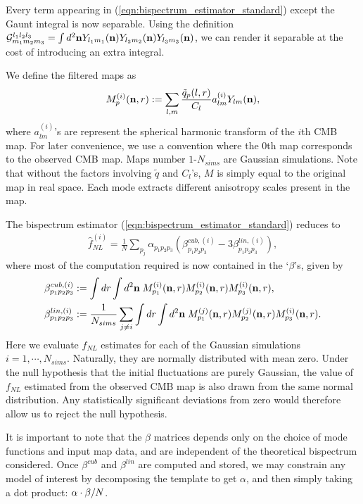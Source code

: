 Every term appearing in (\ref{eqn:bispectrum_estimator_standard}) except the Gaunt integral is now separable. Using the definition $\mathcal{G}^{l_1 l_2 l_3}_{m_1 m_2 m_3} = \int d^2 \mathbf{n} Y_{l_1 m_1}(\mathbf{n}) Y_{l_2 m_2}(\mathbf{n}) Y_{l_3 m_3}(\mathbf{n})$, we can render it separable at the cost of introducing an extra integral.

We define the filtered maps as
\begin{align}
	M^{(i)}_p (\mathbf{n}, r) := \sum_{l,m} \frac{\tilde{q}_p (l,r)}{C_l} a^{(i)}_{lm} Y_{lm} (\mathbf{n}), \label{def:filtered_maps}
\end{align}
where $a^{(i)}_{lm}$'s are represent the spherical harmonic transform of the $i$th CMB map. For later convenience, we use a convention where the $0$th map corresponds to the observed CMB map. Maps number $1$-$N_{sims}$ are Gaussian simulations. Note that without the factors involving $\tilde{q}$ and $C_l$'s, $M$ is simply equal to the original map in real space. Each mode extracts different anisotropy scales present in the map.

The bispectrum estimator (\ref{eqn:bispectrum_estimator_standard}) reduces to
\begin{align}
	\hat{f}_{NL}^{(i)} = \frac{1}{N} \sum_{p_j} \alpha_{p_1 p_2 p_3} (\beta^{cub,(i)}_{p_1 p_2 p_3} - 3 \beta^{lin,(i)}_{p_1 p_2 p_3}), \label{eqn:fNL_from_betas}
\end{align}
where most of the computation required is now contained in the `$\beta$'s, given by
\begin{align}
	\beta^{cub,(i)}_{p_1 p_2 p_3} &:= \int dr \int d^2\mathbf{n} \; M^{(i)}_{p_1} (\mathbf{n},r) M^{(i)}_{p_2} (\mathbf{n},r) M^{(i)}_{p_3} (\mathbf{n},r),	\label{def:beta_cubic} \\
	\beta^{lin,(i)}_{p_1 p_2 p_3} &:= \frac{1}{N_{sims}} \sum_{j \neq i} \int dr \int d^2\mathbf{n} \; M^{(j)}_{p_1} (\mathbf{n},r) M^{(j)}_{p_2} (\mathbf{n},r) M^{(i)}_{p_3} (\mathbf{n},r). \label{def:beta_linear}
\end{align}
Here we evaluate $f_{NL}$ estimates for each of the Gaussian simulations $i=1,\cdots,N_{sims}$. Naturally, they are normally distributed with mean zero. Under the null hypothesis that the initial fluctuations are purely Gaussian, the value of $f_{NL}$ estimated from the observed CMB map is also drawn from the same normal distribution. Any statistically significant deviations from zero would therefore allow us to reject the null hypothesis.

It is important to note that the $\beta$ matrices depends only on the choice of mode functions and input map data, and are independent of the theoretical bispectrum considered. Once $\beta^{cub}$ and $\beta^{lin}$ are computed and stored, we may constrain any model of interest by decomposing the template to get $\alpha$, and then simply taking a dot product: $\mathbf{\alpha} \cdot \mathbf{\beta} / N$.

